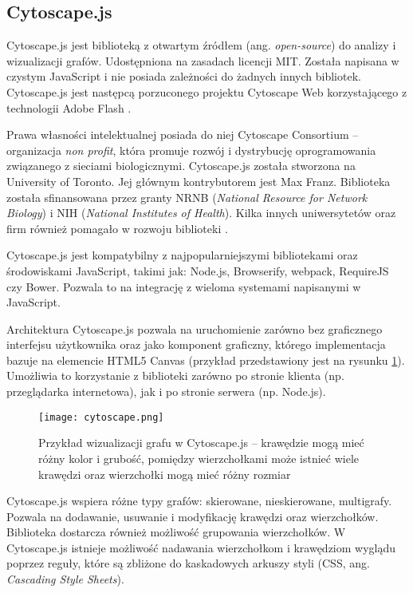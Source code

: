 \subsection{Cytoscape.js}

Cytoscape.js jest biblioteką z otwartym źródłem (ang. \textit{open-source}) do analizy i wizualizacji grafów. Udostępniona na zasadach licencji MIT. Została napisana w czystym JavaScript i nie posiada zależności do żadnych innych bibliotek. Cytoscape.js jest następcą porzuconego projektu Cytoscape Web korzystającego z technologii Adobe Flash \cite[309]{franz}. 

Prawa własności intelektualnej posiada do niej Cytoscape Consortium -- organizacja \textit{non profit}, która promuje rozwój i dystrybucję oprogramowania związanego z sieciami biologicznymi. Cytoscape.js została stworzona na University of Toronto. Jej głównym kontrybutorem jest Max Franz. Biblioteka została sfinansowana przez granty NRNB (\textit{National Resource for Network Biology}) i NIH (\textit{National Institutes of Health}). Kilka innych uniwersytetów oraz firm również pomagało w rozwoju biblioteki \cite{cytoscape}. 

Cytoscape.js jest kompatybilny z najpopularniejszymi bibliotekami oraz środowiskami JavaScript, takimi jak: Node.js, Browserify, webpack, RequireJS czy Bower. Pozwala to na integrację z wieloma systemami napisanymi w JavaScript. 

Architektura Cytoscape.js pozwala na uruchomienie zarówno bez graficznego interfejsu użytkownika oraz jako komponent graficzny, którego implementacja bazuje na elemencie HTML5 Canvas (przykład przedstawiony jest na rysunku \ref{fig:cytoscape}). Umożliwia to korzystanie z biblioteki zarówno po stronie klienta (np. przeglądarka internetowa), jak i po stronie serwera (np. Node.js).

\begin{figure}[H]
\centering
\texttt{[image: cytoscape.png]}
\captionsetup{justification=centering}
\caption{Przykład wizualizacji grafu w Cytoscape.js -- krawędzie mogą mieć różny kolor i grubość, pomiędzy wierzchołkami może istnieć wiele krawędzi oraz wierzchołki mogą mieć różny rozmiar}\label{fig:cytoscape}
\end{figure}

Cytoscape.js wspiera różne typy grafów: skierowane, nieskierowane, multigrafy. Pozwala na dodawanie, usuwanie i modyfikację krawędzi oraz wierzchołków. Biblioteka dostarcza również możliwość grupowania wierzchołków. W Cytoscape.js istnieje możliwość nadawania wierzchołkom i krawędziom wyglądu poprzez reguły, które są zbliżone do kaskadowych arkuszy styli (CSS, ang. \textit{Cascading Style Sheets}).

